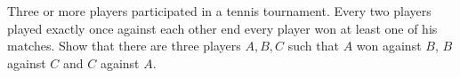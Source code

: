 Three or more players participated in a tennis tournament.
Every two players played exactly once against each other end every player won at least
one of his matches. Show that there are three players $A,B,C$ such that $A$ won against $B$,
$B$ against $C$ and $C$ against $A$.